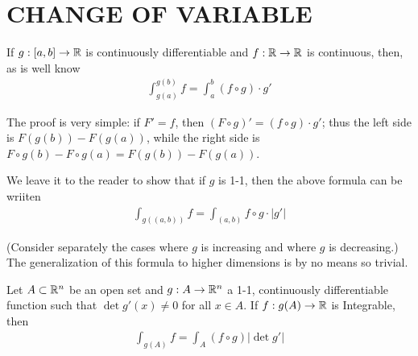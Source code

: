 \clearpage
\section{CHANGE OF VARIABLE}
If $g:[a,b]\to \mathbb{R}$ is continuously differentiable and $f: \mathbb{R}\to \mathbb{R}$
is continuous, then, as is well know 
\begin{align*}
    \int_{g(a)}^{g(b)} f = \int_a^b (f\circ g)\cdot g'
\end{align*}

The proof is very simple: if $F' = f$, then $(F\circ g)' = (f\circ g)\cdot g'$;
thus the left side is $F(g(b)) - F(g(a))$, while the right side is $F\circ g(b) - F\circ g(a)
= F(g(b)) - F(g(a))$.

We leave it to the reader to show that if $g$ is 1-1, then the above formula can be wriiten
\begin{align*}
    \int_{g((a,b))} f = \int_{(a,b)} f\circ g\cdot |g'|
\end{align*} 

(Consider separately the cases where $g$ is increasing and where
$g$ is decreasing.) The generalization of this formula to higher
dimensions is by no means so trivial.


\begin{theorem}
    Let $A\subset \mathbb{R}^n$ be an open set and $g:A\to \mathbb{R}^n$ a 1-1, continuously differentiable
    function such that $\det g'(x)\neq 0$ for all $x\in A$. If $f:g(A)\to \mathbb{R}$ is Integrable, then
    \begin{align*}
        \int_{g(A)} f = \int_A (f\circ g)|\det g'|
    \end{align*} 
\end{theorem}

